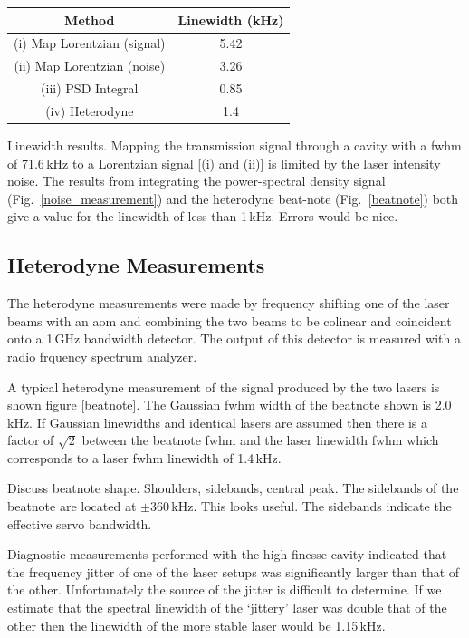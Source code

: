 \documentclass{article}
\newenvironment{Figure}
  {\par\medskip\noindent\minipage{\linewidth}}
  {\endminipage\par\medskip}
\begin{document}
\begin{multicols}{2}
\begin{Figure}
\centering
\begin{tabular}{|c|c|}
\hline
  Method & Linewidth (kHz) \\ \hline
  (i) Map Lorentzian (signal)  & 5.42 \\
  (ii) Map Lorentzian (noise) & 3.26 \\
  (iii) PSD Integral & 0.85 \\
  (iv) Heterodyne & 1.4 \\ \hline\end{tabular}
\captionsetup{type=table}
\caption{Linewidth results. Mapping the transmission signal through a cavity with a \gls*{fwhm} of 71.6\,kHz to a Lorentzian signal [(i) and (ii)] is limited by the laser intensity noise. The results from integrating the power-spectral density signal (Fig.~\ref{noise_measurement}) and the heterodyne beat-note (Fig.~\ref{beatnote}) both give a value for the linewidth of less than 1\,kHz. {\color{red}Errors would be nice.}}
\label{linewidth_table}
\end{Figure}

\subsection{Heterodyne Measurements}
The heterodyne measurements were made by frequency shifting one of the laser beams with an \gls*{aom} and combining the two beams to be colinear and coincident onto a 1\,GHz bandwidth detector\cite{nf_det}. The output of this detector is measured with a radio frquency spectrum analyzer\cite{rs_sa}.

A typical heterodyne measurement of the signal produced by the two lasers is shown figure \ref{beatnote}. The Gaussian \gls*{fwhm} width of the beatnote shown is 2.0\,kHz. If Gaussian linewidths and identical lasers are assumed then there is a factor of $\sqrt{2}$ between the beatnote \gls*{fwhm} and the laser linewidth \gls*{fwhm} which corresponds to a laser \gls*{fwhm} linewidth of 1.4\,kHz.

{\color{red}Discuss beatnote shape. Shoulders, sidebands, central peak. The sidebands of the beatnote are located at $\pm$360\,kHz. This looks useful.\cite{di_domenico_simple_2010} The sidebands indicate the effective servo bandwidth.}

Diagnostic measurements performed with the high-finesse cavity indicated that the frequency jitter of one of the laser setups was significantly larger than that of the other. Unfortunately the source of the jitter is difficult to determine. If we estimate that the spectral linewidth of the `jittery' laser was double that of the other then the linewidth of the more stable laser would be 1.15\,kHz.


\end{multicols}
\end{document}
